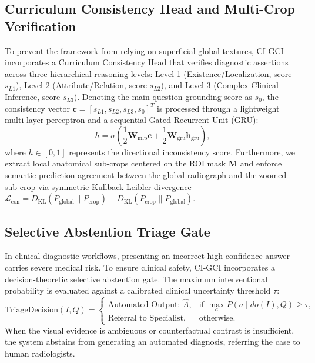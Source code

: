 \documentclass[journal,twoside,web]{ieeecolor}
\begin{document}
\subsection{Curriculum Consistency Head and Multi-Crop Verification}
To prevent the framework from relying on superficial global textures, CI-GCI incorporates a Curriculum Consistency Head that verifies diagnostic assertions across three hierarchical reasoning levels: Level 1 (Existence/Localization, score $s_{L1}$), Level 2 (Attribute/Relation, score $s_{L2}$), and Level 3 (Complex Clinical Inference, score $s_{L3}$). Denoting the main question grounding score as $s_0$, the consistency vector $\mathbf{c} = [s_{L1}, s_{L2}, s_{L3}, s_0]^T$ is processed through a lightweight multi-layer perceptron and a sequential Gated Recurrent Unit (GRU):
\begin{equation}
h = \sigma\left(\frac{1}{2} \mathbf{W}_{\text{mlp}} \mathbf{c} + \frac{1}{2} \mathbf{W}_{\text{gru}} \mathbf{h}_{\text{gru}}\right),
\label{eq:consistency_score}
\end{equation}
where $h \in [0, 1]$ represents the directional inconsistency score. Furthermore, we extract local anatomical sub-crops centered on the ROI mask $\mathbf{M}$ and enforce semantic prediction agreement between the global radiograph and the zoomed sub-crop via symmetric Kullback-Leibler divergence $\mathcal{L}_{\text{con}} = D_{\text{KL}}(P_{\text{global}} \parallel P_{\text{crop}}) + D_{\text{KL}}(P_{\text{crop}} \parallel P_{\text{global}})$.

\subsection{Selective Abstention Triage Gate}
In clinical diagnostic workflows, presenting an incorrect high-confidence answer carries severe medical risk. To ensure clinical safety, CI-GCI incorporates a decision-theoretic selective abstention gate. The maximum interventional probability is evaluated against a calibrated clinical uncertainty threshold $\tau$:
\begin{equation}
\text{TriageDecision}(I, Q) = \begin{cases} 
\text{Automated Output: } \hat{A}, & \text{if } \max\limits_{a} P(a \mid do(I), Q) \ge \tau, \\[4pt]
\text{Referral to Specialist}, & \text{otherwise.}
\end{cases}
\label{eq:abstain}
\end{equation}
When the visual evidence is ambiguous or counterfactual contrast is insufficient, the system abstains from generating an automated diagnosis, referring the case to human radiologists.
\end{document}
